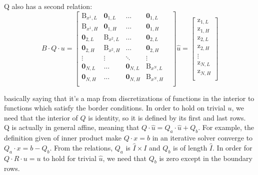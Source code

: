 \documentclass[11pt]{article}
\begin{document}
\begin{itemize}
	Q also has a second relation: 
	\begin{equation}
		B\cdot Q\cdot u  = 
		\begin{bmatrix}
			\text{B}_{x^{1},L} & \mathbf{0}_{1,L}       & ...    & \mathbf{0}_{1,L}\\
			\text{B}_{x^{1},H} & \mathbf{0}_{1,H}       & ...    & \mathbf{0}_{1,H}\\
			\mathbf{0}_{2,L}   & \text{B}_{x^{2},L} &   ...    & \mathbf{0}_{2,L}\\
			\mathbf{0}_{2,H}   & \text{B}_{x^{2},H} &   ...    & \mathbf{0}_{2,H}\\
			\vdots  & \vdots  & \ddots & \vdots \\
			\mathbf{0}_{N,L}       & ...    & \mathbf{0}_{N,L} & \text{B}_{x^{N},L} & \\
			\mathbf{0}_{N,H}       & ...    & \mathbf{0}_{N,H} & \text{B}_{x^{N},H} & \\
		\end{bmatrix}
		\hat{u}
		=
		\begin{bmatrix}
			\text{z}_{{1},L}\\
			\text{z}_{{1},H}\\
			\text{z}_{{2},L}\\
			\text{z}_{{2},H}\\
			\vdots\\
			\text{z}_{{N},L}\\
			\text{z}_{{N},H}\\
		\end{bmatrix}
		\label{Q_operator_2}
	\end{equation}
	
	basically saying that it's a map from discretizations of functions in the interior to functions which satisfy the border conditions. In order to hold on trivial $u$, we need that the interior of $Q$ is identity, so it is defined by its first and last rows.\\
	Q is actually in general affine, meaning that $Q\cdot \hat{u} = Q_a\cdot \hat{u} + Q_b$. For example, the definition given of inner product make $Q\cdot x=b$ in an iterative solver converge to $Q_a\cdot x = b - Q_b$. From the relations, $Q_a$ is $\hat{I}\times I$ and $Q_b$ is of length $\hat{I}$. In order for $Q\cdot R\cdot u = u$ to hold for trivial $\hat{u}$, we need that $Q_b$ is zero except in the boundary rows.
	

\end{itemize}
\end{document}
